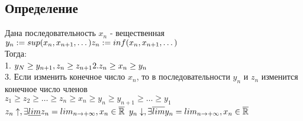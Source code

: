 \documentclass[12pt, a4paper]{article}
\newcommand{\nl}{\newline}
\begin{document}
\subsection{Определение}
Дана последовательность $ x_n $ - вещественная \nl
$ y_n:= sup(x_n,x_{n+1},\dots) \\
z_n:= inf(x_n,x_{n+1},\dots) $\\
Тогда: \\
1. $ y_N \geq y_{n+1} , z_n \geq z_{n+1} \\
2. z_n \geq x_n \geq y_n $\\
3. Если изменить конечное число $ x_n $, то в последовательности $ y_n $ и $ z_n $ изменится конечное число членов\nl \\
$z_1 \geq z_2 \geq \dots \geq z_n \geq x_n \geq y_n \geq y_{n+1} \geq \dots \geq y_1$ \\
$ z_n\uparrow, \exists \underline{lim} z_n = lim_{n\rightarrow+\infty} , x_n \in \overline{\mathbb{R}} \\$
$ y_n\downarrow, \exists \overline{lim} y_n = lim_{n\rightarrow+\infty} , x_n \in \overline{\mathbb{R}} \\$
\end{document}
